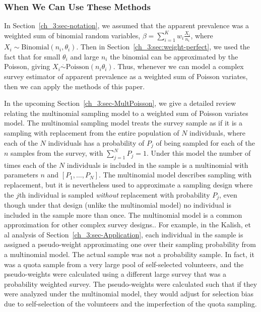 \subsubsection{When We Can Use These Methods}

In Section~\ref{ch_3:sec-notation}, we assumed that the apparent prevalence was a weighted sum of binomial random variables,
$\beta = \sum_{i=1}^{K} w_i \frac{X_i}{n_i}$, where $X_i \sim \textrm{Binomial}(n_i,\theta_i)$.
Then in Section~\ref{ch_3:sec:weight-perfect}, we used the fact that for small $\theta_i$ and large $n_i$
the binomial can be approximated by the Poisson, giving $X_i \stackrel{\cdot}{\sim} \textrm{Poisson}( n_i \theta_i)$.
Thus, whenever we can model a complex survey estimator of apparent prevalence as a weighted sum of Poisson variates, then we can apply the methods of this paper.

In the upcoming Section~\ref{ch_3:sec-MultPoisson}, we give a detailed review relating the multinomial sampling model to a weighted sum of Poisson variates model.
The multinomial sampling model treats the survey sample as if it is a sampling with replacement from the entire population of $N$ individuals, where each of the $N$
individuals has a probability of $P_j$ of being sampled for each of the $n$ samples from the survey, with $\sum_{j=1}^{N} P_j = 1$. Under this model the number of times each of the $N$ individuals
is included in the sample is a multinomial with parameters $n$ and $[P_1,\ldots, P_N]$.
The multinomial model describes sampling with replacement, but it is nevertheless used to approximate a sampling design where the $j$th individual is sampled {\it without} replacement with probability $P_j$, even though under that design (unlike the multinomial model) no individual is included in the sample more than once. The multinomial model is a common approximation for other complex survey designs.\citep[see e.g.,][p. 14]{Korn:1999}.
For example, in the Kalish, et al\cite{Kali:2021} analysis of Section~\ref{ch_3:sec-Application}, each individual in the sample is assigned a pseudo-weight approximating one over their sampling probability from
a multinomial model. The actual sample was not a probability sample. In fact, it was a quota sample from a very large pool of self-selected volunteers, and the pseudo-weights were calculated using a different large survey that was a probability weighted survey. The pseudo-weights were calculated such that if they were analyzed under the multinomial model, they would adjust for selection bias due to self-selection of the volunteers and the imperfection of the quota sampling.

